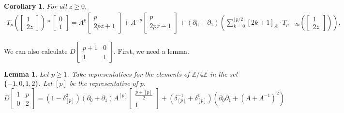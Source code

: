 \documentclass{article}
\newcommand{\del}{\partial}
\newcommand{\Z}{\mathbb{Z}}
\newcommand{\fourmat}[4]{\begin{bmatrix}#1&#2\\#3&#4\end{bmatrix}}
\newcommand{\lilmat}[4]{\left[\begin{smallmatrix}#1&#2\\#3&#4\end{smallmatrix}\right]}
\newcommand{\two}[2]{\begin{bmatrix}#1\\#2\end{bmatrix}}
\newtheorem{lemma}[theorem]{Lemma}
\newtheorem{corollary}[theorem]{Corollary}
\theoremstyle{definition}
\begin{document}
\begin{corollary}
    For all $z\geq 0$,
    \begin{align*}
        T_p(\two{1}{2z})*\two{0}{1}
        =
        A^p\two{p}{2pz+1}
        +A^{-p}\two{p}{2pz-1}
        +
        (\del_0+\del_1)(\sum_{k=0}^{\lfloor p/2\rfloor}[2k+1]_A\cdot T_{p-2k}(\two{1}{2z})).
    \end{align*}
\end{corollary}

We can also calculate $D\lilmat{p+1}{0}{1}{1}$. First, we need a lemma.

\begin{lemma}\label{lem:discrep-1p02}
Let $p\geq 1$. Take representatives for the elements of $\Z/4\Z$ in the set $\{-1,0,1,2\}$. Let $[p]$ be the representative of $p$.
    \[
    D\fourmat{1}{p}{0}{2}=(1-\delta_{[p]}^2)(\del_0+\del_1)A^{[p]}\two{\frac{p+[p]}{2}}{1}+(\delta_{[p]}^{-1}+\delta_{[p]}^1)(\del_0\del_1+(A+A^{-1})^2)
    \]
\end{lemma}
\end{document}
